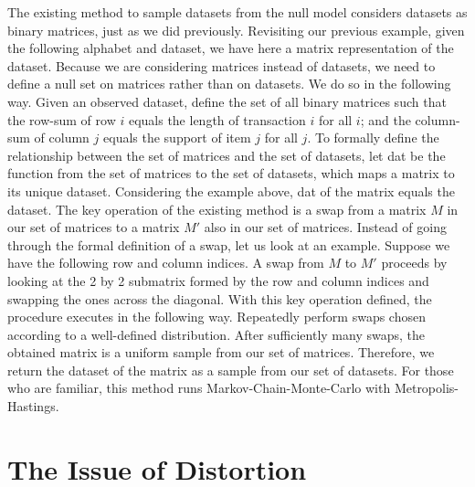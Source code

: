 \documentclass{article}
\begin{document}
The existing method to sample datasets from the null model considers datasets as
binary matrices, just as we did previously. Revisiting our previous example,
given the following alphabet and dataset, we have here a matrix representation
of the dataset. Because we are considering matrices instead of datasets, we need
to define a null set on matrices rather than on datasets. We do so in the
following way. Given an observed dataset, define the set of all binary matrices
such that the row-sum of row $i$ equals the length of transaction $i$ for all
$i$; and the column-sum of column $j$ equals the support of item $j$ for all
$j$. To formally define the relationship between the set of matrices and the set
of datasets, let dat be the function from the set of matrices to the set of
datasets, which maps a matrix to its unique dataset. Considering the example
above, dat of the matrix equals the dataset. The key operation of the existing
method is a swap from a matrix $M$ in our set of matrices to a matrix $M'$ also
in our set of matrices. Instead of going through the formal definition of a
swap, let us look at an example. Suppose we have the following row and column
indices. A swap from $M$ to $M'$ proceeds by looking at the 2 by 2 submatrix
formed by the row and column indices and swapping the ones across the diagonal.
With this key operation defined, the procedure executes in the following way.
Repeatedly perform swaps chosen according to a well-defined distribution. After
sufficiently many swaps, the obtained matrix is a uniform sample from our set of
matrices. Therefore, we return the dataset of the matrix as a sample from our
set of datasets. For those who are familiar, this method runs
Markov-Chain-Monte-Carlo with Metropolis-Hastings.

\section*{The Issue of Distortion}
\end{document}
